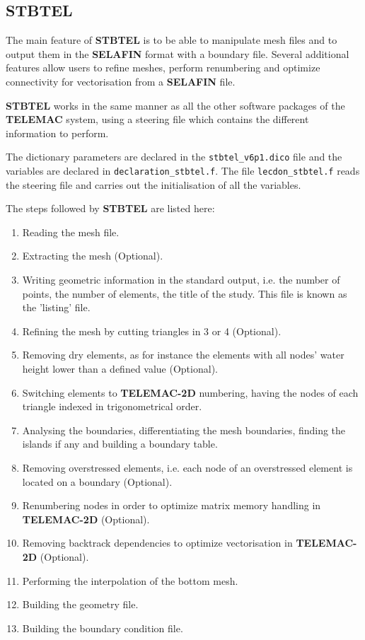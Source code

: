 \documentclass[a4paper,10pt]{article}
\newcommand{\tel}{\textbf{TELEMAC}\xspace}
\newcommand{\teld}{\textbf{TELEMAC-2D}\xspace}
\newcommand{\stb}{\textbf{STBTEL}\xspace}
\newcommand{\slf}{\textbf{SELAFIN}\xspace}
\begin{document}
\subsection{\stb}
The main feature of \stb is to be able to manipulate mesh files and to output
them in the \slf format with a boundary file. Several additional features allow
users to refine meshes, perform renumbering and optimize connectivity for
vectorisation from a \slf file.

\stb works in the same manner as all the other software packages of the \tel
system, using a steering file which contains the different information to
perform.

The dictionary parameters are declared in the \verb+stbtel_v6p1.dico+ file and
the variables are declared in \verb+declaration_stbtel.f+. The file
\verb+lecdon_stbtel.f+ reads the steering file and carries out the
initialisation of all the variables.

The steps followed by \stb are listed here:

\begin{enumerate}
\setlength{\itemsep}{1pt}
\setlength{\parskip}{0pt}
\setlength{\parsep}{0pt}
\item Reading the mesh file.
\item Extracting the mesh (Optional).
\item Writing geometric information in the standard output, i.e. the number of
points, the number of elements, the title of the study. This file is known as
the 'listing' file.
\item Refining the mesh by cutting triangles in 3 or 4 (Optional).
\item Removing dry elements, as for instance the elements with all nodes' water
height lower than a defined value (Optional).
\item Switching elements to \teld numbering, having the nodes of each triangle
indexed in trigonometrical order.
\item Analysing the boundaries, differentiating the mesh boundaries, finding
the islands if any and building a boundary table.
\item Removing overstressed elements, i.e. each node of an overstressed element
is located on a boundary (Optional).
\item Renumbering nodes in order to optimize matrix memory handling in \teld
(Optional).
\item Removing backtrack dependencies to optimize vectorisation in \teld
(Optional).
\item Performing the interpolation of the bottom mesh.
\item Building the geometry file.
\item Building the boundary condition file.
\end{enumerate}
\end{document}
